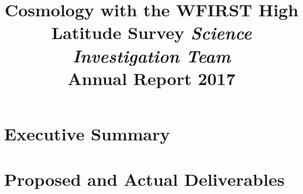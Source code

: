 \documentclass[letter]{ar-1col_WFIRST-HLS}
\begin{document}

\thispagestyle{empty}


\cleardoublepage



\title{Cosmology with the WFIRST High Latitude Survey \emph{Science Investigation Team}\\ Annual Report 2017}



\maketitle

\tableofcontents
\thispagestyle{empty}

\newpage
{}

\section{Executive Summary}
\label{sec:executive_summary}


\section{Proposed and Actual Deliverables}
\label{sec:deliverables}

\end{document}
